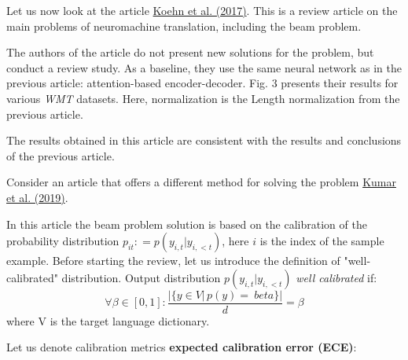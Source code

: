 \documentclass[a4paper,14pt]{extarticle}
\newcommand{\bibref}[3]{\hyperlink{#1}{#2 (#3)}}
\begin{document}
	Let us now look at the article \bibref{six_chall}{Koehn et al.}{2017}. This is a review article on the main problems of neuromachine translation, including the beam problem.
	
	The authors of the article do not present new solutions for the problem, but conduct a review study. As a baseline, they use the same neural network as in the previous article: attention-based encoder-decoder. Fig. 3 presents their results for various \textit{WMT} datasets. Here, normalization is the Length normalization from the previous article.
	
	\begin{figure}[t]
	\end{figure}
	
	The results obtained in this article are consistent with the results and conclusions of the previous article.
	
	Consider an article that offers a different method for solving the problem \bibref{calibration}{Kumar et al.}{2019}.

	In this article the beam problem solution is based on the calibration of the probability distribution $p_{it}: = p(y_{i, t} | y_{i,<t})$, here $i$ is the index of the sample example. Before starting the review, let us introduce the definition of "well-calibrated" distribution. Output distribution $p (y_{i, t} | y_{i, <t})$ \textit{well calibrated} if:
	\[
		\forall \beta \in [0, 1]: \frac{ | \{ y \in V |\, p(y) = \ beta \} | }{d}=\beta
	\]
	where V is the target language dictionary.
	
	Let us denote calibration metrics \textbf{expected calibration error (ECE)}:
	
\end{document}
